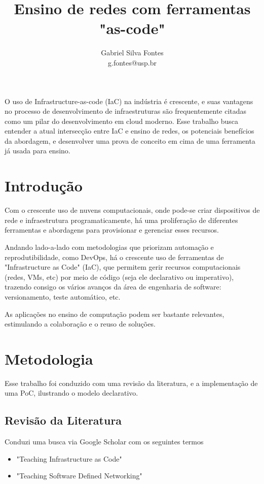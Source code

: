 \documentclass[12pt]{article}
\title{Ensino de redes com ferramentas "as-code"}
\author{Gabriel Silva Fontes\inst{1} \\ g.fontes@usp.br}
\begin{document}
\maketitle

\begin{resumo}
    O uso de Infrastructure-as-code (IaC) na indústria é crescente, e suas
    vantagens no processo de desenvolvimento de infraestruturas são
    frequentemente citadas como um pilar do desenvolvimento em cloud moderno.
    Esse trabalho busca entender a atual intersecção entre IaC e ensino de
    redes, os potenciais benefícios da abordagem, e desenvolver uma prova de
    conceito em cima de uma ferramenta já usada para ensino.
\end{resumo}

\section{Introdução}

Com o crescente uso de nuvens computacionais, onde pode-se criar dispositivos
de rede e infraestrutura programaticamente, há uma proliferação de diferentes
ferramentas e abordagens para provisionar e gerenciar esses recursos.

Andando lado-a-lado com metodologias que priorizam automação e
reprodutibilidade, como DevOps, há o crescente uso de ferramentas de
"Infrastructure as Code" (IaC), que permitem gerir recursos computacionais
(redes, VMs, etc) por meio de código (seja ele declarativo ou imperativo),
trazendo consigo os vários avanços da área de engenharia de software:
versionamento, teste automático, etc.

As aplicações no ensino de computação podem ser bastante relevantes,
estimulando a colaboração e o reuso de soluções.

\section{Metodologia}

Esse trabalho foi conduzido com uma revisão da literatura, e a implementação de
uma PoC, ilustrando o modelo declarativo.

\subsection{Revisão da Literatura}

Conduzi uma busca via Google Scholar com os seguintes termos

\begin{itemize}
    \item "Teaching Infrastructure as Code"
    \item "Teaching Software Defined Networking"
\end{itemize}
\end{document}
